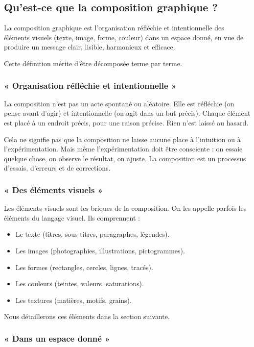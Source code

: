 \subsection{Qu'est-ce que la composition graphique ?}

La composition graphique est l'organisation réfléchie et intentionnelle des éléments visuels (texte, image, forme, couleur) dans un espace donné, en vue de produire un message clair, lisible, harmonieux et efficace.

Cette définition mérite d'être décomposée terme par terme.

\subsubsection{« Organisation réfléchie et intentionnelle »}

La composition n'est pas un acte spontané ou aléatoire. Elle est réfléchie (on pense avant d'agir) et intentionnelle (on agit dans un but précis). Chaque élément est placé à un endroit précis, pour une raison précise. Rien n'est laissé au hasard.

Cela ne signifie pas que la composition ne laisse aucune place à l'intuition ou à l'expérimentation. Mais même l'expérimentation doit être consciente : on essaie quelque chose, on observe le résultat, on ajuste. La composition est un processus d'essais, d'erreurs et de corrections.

\subsubsection{« Des éléments visuels »}

Les éléments visuels sont les briques de la composition. On les appelle parfois les éléments du langage visuel. Ils comprennent :
\begin{itemize}
  \item Le texte (titres, sous-titres, paragraphes, légendes).
  \item Les images (photographies, illustrations, pictogrammes).
  \item Les formes (rectangles, cercles, lignes, tracés).
  \item Les couleurs (teintes, valeurs, saturations).
  \item Les textures (matières, motifs, grains).
\end{itemize}

Nous détaillerons ces éléments dans la section suivante.

\subsubsection{« Dans un espace donné »}

